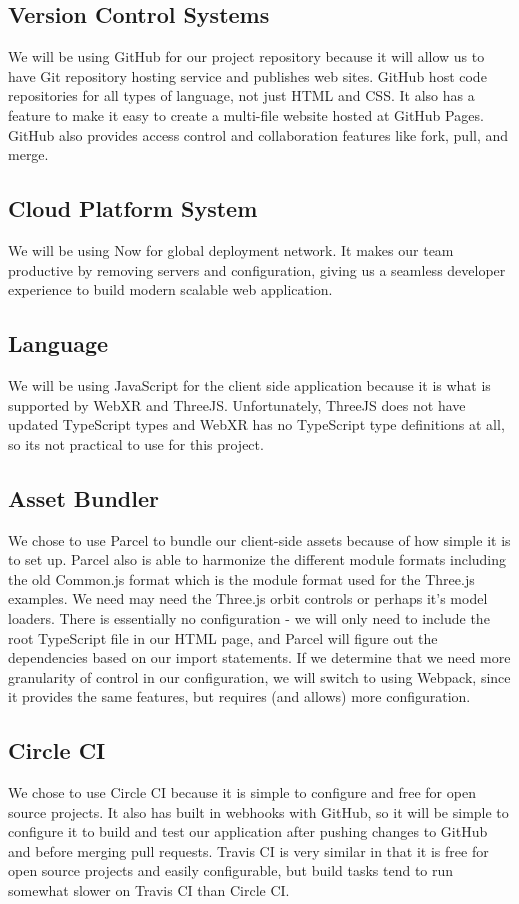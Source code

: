 \documentclass[onecolumn, draftclsnofoot,10pt, compsoc]{IEEEtran}
\begin{document}
\subsection{Version Control Systems}
We will be using GitHub for our project repository because it will allow us to have Git repository hosting service and publishes web sites. GitHub host code repositories for all types of language, not just HTML and CSS. It also has a feature to make it easy to create a multi-file website hosted at GitHub Pages. GitHub also provides access control and collaboration features like fork, pull, and merge.  

\subsection{Cloud Platform System}
We will be using Now for global deployment network. It makes our team productive by removing servers and configuration, giving us a seamless developer experience to build modern scalable web application.

\subsection{Language}
We will be using JavaScript for the client side application because it is what is supported by WebXR and ThreeJS. Unfortunately, ThreeJS does not have updated TypeScript types and WebXR has no TypeScript type definitions at all, so its not practical to use for this project.

\subsection{Asset Bundler}
We chose to use Parcel to bundle our client-side assets because of how simple it is to set up. Parcel also is able to harmonize the different module formats including the old Common.js format which is the module format used for the Three.js examples.  We need may need the Three.js orbit controls or perhaps it's model loaders.  There is essentially no configuration - we will only need to include the root TypeScript file in our HTML page, and Parcel will figure out the dependencies based on our import statements. If we determine that we need more granularity of control in our configuration, we will switch to using Webpack, since it provides the same features, but requires (and allows) more configuration. 

\subsection{Circle CI}
We chose to use Circle CI because it is simple to configure and free for open source projects. It also has built in webhooks with GitHub, so it will be simple to configure it to build and test our application after pushing changes to GitHub and before merging pull requests. Travis CI is very similar in that it is free for open source projects and easily configurable, but build tasks tend to run somewhat slower on Travis CI than Circle CI.
\end{document}
